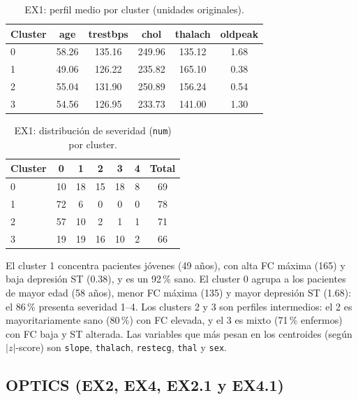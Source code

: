 \documentclass[11pt,a4paper]{article}
\begin{document}
\begin{table}[H]
  \centering
  \caption{EX1: perfil medio por cluster (unidades originales).}
  \label{tab:centroides}
  \begin{tabular}{@{}lccccc@{}}
    \toprule
    \textbf{Cluster} & \textbf{age} & \textbf{trestbps} & \textbf{chol} & \textbf{thalach} & \textbf{oldpeak} \\
    \midrule
    0 & 58.26 & 135.16 & 249.96 & 135.12 & 1.68 \\
    1 & 49.06 & 126.22 & 235.82 & 165.10 & 0.38 \\
    2 & 55.04 & 131.90 & 250.89 & 156.24 & 0.54 \\
    3 & 54.56 & 126.95 & 233.73 & 141.00 & 1.30 \\
    \bottomrule
  \end{tabular}
\end{table}

\begin{table}[H]
  \centering
  \caption{EX1: distribución de severidad (\texttt{num}) por cluster.}
  \label{tab:severidad}
  \begin{tabular}{@{}lcccccc@{}}
    \toprule
    \textbf{Cluster} & \textbf{0} & \textbf{1} & \textbf{2} & \textbf{3} & \textbf{4} & \textbf{Total} \\
    \midrule
    0 & 10 & 18 & 15 & 18 & 8 & 69 \\
    1 & 72 & 6 & 0 & 0 & 0 & 78 \\
    2 & 57 & 10 & 2 & 1 & 1 & 71 \\
    3 & 19 & 19 & 16 & 10 & 2 & 66 \\
    \bottomrule
  \end{tabular}
\end{table}

El cluster 1 concentra pacientes jóvenes (49 años), con alta FC máxima (165) y baja depresión
ST (0.38), y es un 92\,\% sano. El cluster 0 agrupa a los pacientes de mayor edad (58 años),
menor FC máxima (135) y mayor depresión ST (1.68): el 86\,\% presenta severidad 1--4. Los
clusters 2 y 3 son perfiles intermedios: el 2 es mayoritariamente sano (80\,\%) con FC
elevada, y el 3 es mixto (71\,\% enfermos) con FC baja y ST alterada. Las variables que más
pesan en los centroides (según $|z|$-score) son \texttt{slope}, \texttt{thalach},
\texttt{restecg}, \texttt{thal} y \texttt{sex}.

\subsection{OPTICS (EX2, EX4, EX2.1 y EX4.1)}
\end{document}
